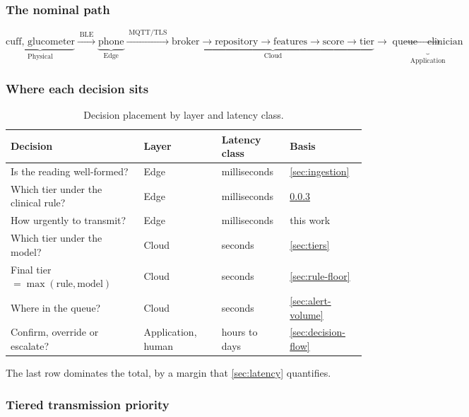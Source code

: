 \documentclass[12pt,a4paper,oneside]{report}
\begin{document}
\subsubsection{The nominal path}

\begin{equation}
\underbrace{\text{cuff, glucometer}}_{\text{Physical}}
\xrightarrow{\;\text{BLE}\;}
\underbrace{\text{phone}}_{\text{Edge}}
\xrightarrow{\;\text{MQTT/TLS}\;}
\underbrace{\text{broker} \to \text{repository} \to \text{features} \to \text{score} \to \text{tier}}_{\text{Cloud}}
\to \underbrace{\text{queue} \to \text{clinician}}_{\text{Application}}
\end{equation}

\subsubsection{Where each decision sits}

\begin{table}[htbp]
\centering\small
\caption{Decision placement by layer and latency class.}\label{tab:decision-placement}
\begin{tabularx}{\textwidth}{@{}X >{\raggedright\arraybackslash}p{2.8cm} >{\raggedright\arraybackslash}p{2.4cm} >{\raggedright\arraybackslash}p{2.1cm}@{}}
\toprule
\textbf{Decision} & \textbf{Layer} & \textbf{Latency class} & \textbf{Basis} \\
\midrule
Is the reading well-formed? & Edge & milliseconds & \cref{sec:ingestion} \\
Which tier under the clinical rule? & Edge & milliseconds & \cref{sec:transmission-priority} \\
How urgently to transmit? & Edge & milliseconds & this work \\
Which tier under the model? & Cloud & seconds & \cref{sec:tiers} \\
Final tier $=\max(\text{rule},\text{model})$ & Cloud & seconds & \cref{sec:rule-floor} \\
Where in the queue? & Cloud & seconds & \cref{sec:alert-volume} \\
Confirm, override or escalate? & Application, human & hours to days & \cref{sec:decision-flow} \\
\bottomrule
\end{tabularx}
\end{table}

The last row dominates the total, by a margin that \cref{sec:latency} quantifies.

\subsubsection{Tiered transmission priority}\label{sec:transmission-priority}
\end{document}
